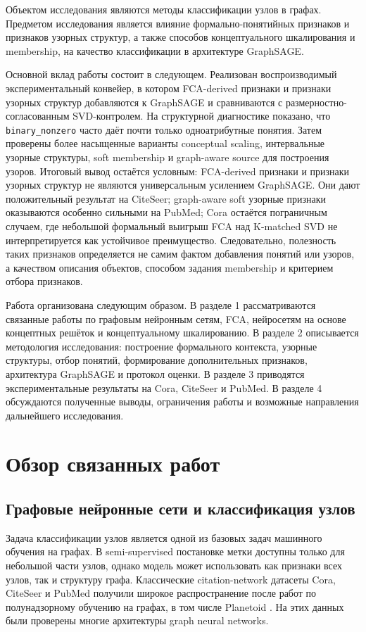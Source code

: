 \documentclass[14pt,a4paper]{extarticle}
\begin{document}
Объектом исследования являются методы классификации узлов в графах. Предметом
исследования является влияние формально-понятийных признаков и признаков узорных структур,
а также способов концептуального шкалирования и membership, на качество
классификации в архитектуре GraphSAGE.

Основной вклад работы состоит в следующем. Реализован воспроизводимый
экспериментальный конвейер, в котором FCA-derived признаки и признаки узорных структур
добавляются к GraphSAGE и сравниваются с размерностно-согласованным SVD-контролем.
На структурной диагностике показано, что \texttt{binary\_nonzero} часто даёт почти
только одноатрибутные понятия. Затем проверены более насыщенные варианты
conceptual scaling, интервальные узорные структуры, soft membership и graph-aware
source для построения узоров. Итоговый вывод остаётся условным: FCA-derived
признаки и признаки узорных структур не являются универсальным усилением
GraphSAGE. Они дают положительный результат на CiteSeer; graph-aware soft
узорные признаки оказываются особенно сильными на PubMed; Cora остаётся
пограничным случаем, где небольшой формальный выигрыш FCA над K-matched SVD не
интерпретируется как устойчивое преимущество. Следовательно, полезность таких
признаков определяется не самим фактом добавления понятий или узоров, а качеством
описания объектов, способом задания membership и критерием отбора признаков.

Работа организована следующим образом. В разделе 1 рассматриваются связанные
работы по графовым нейронным сетям, FCA, нейросетям на основе концептных решёток
и концептуальному шкалированию. В разделе 2 описывается методология исследования:
построение формального контекста, узорные структуры, отбор понятий,
формирование дополнительных признаков, архитектура GraphSAGE и протокол оценки. В
разделе 3 приводятся экспериментальные результаты на Cora, CiteSeer и PubMed. В
разделе 4 обсуждаются полученные выводы, ограничения работы и возможные
направления дальнейшего исследования.

\section{Обзор связанных работ}

\subsection{Графовые нейронные сети и классификация узлов}

Задача классификации узлов является одной из базовых задач машинного обучения на
графах. В semi-supervised постановке метки доступны только для небольшой части
узлов, однако модель может использовать как признаки всех узлов, так и структуру
графа. Классические citation-network датасеты Cora, CiteSeer и PubMed получили
широкое распространение после работ по полунадзорному обучению на графах, в том
числе Planetoid \cite{yang2016planetoid}. На этих данных были проверены многие
архитектуры graph neural networks.
\end{document}
